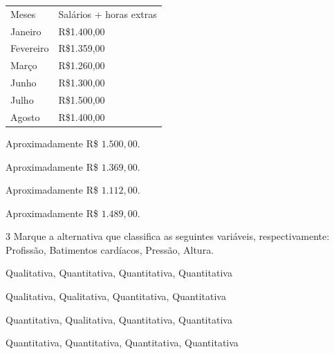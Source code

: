 \begin{longtable}[]{@{}ll@{}}
\toprule
\endhead
Meses & Salários + horas extras\tabularnewline
Janeiro & R\$1.400,00\tabularnewline
Fevereiro & R\$1.359,00\tabularnewline
Março & R\$1.260,00\tabularnewline
Junho & R\$1.300,00\tabularnewline
Julho & R\$1.500,00\tabularnewline
Agosto & R\$1.400,00\tabularnewline
\bottomrule
\end{longtable}

\begin{escolha}
\item Aproximadamente R\$ $1.500,00$.
\item Aproximadamente R\$ $1.369,00$.
\item Aproximadamente R\$ $1.112,00$.
\item Aproximadamente R\$ $1.489,00$.
\end{escolha}



\num{3} Marque a alternativa que classifica as seguintes variáveis,
respectivamente: Profissão, Batimentos cardíacos, Pressão, Altura.

\begin{escolha}
\item Qualitativa, Quantitativa, Quantitativa, Quantitativa
\item Qualitativa, Qualitativa, Quantitativa, Quantitativa
\item Quantitativa, Qualitativa, Quantitativa, Quantitativa
\item Quantitativa, Quantitativa, Quantitativa, Quantitativa
\end{escolha}


